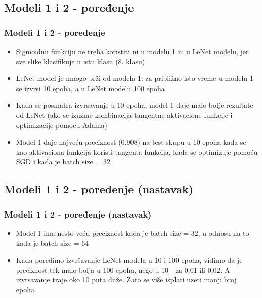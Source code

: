 \documentclass{beamer}
\begin{document}
\subsection{Modeli 1 i 2 - poređenje}
\begin{frame}
\frametitle{Modeli 1 i 2 - poređenje}

\begin{itemize}
\item Sigmoidnu funkciju ne treba koristiti ni u modelu 1 ni u LeNet modelu, jer sve slike klasifikuje u istu klasu (8. klasu)
\item LeNet model je mnogo brži od modela 1: za približno isto vreme u modelu 1 se izvrsi 10 epoha, a u LeNet modelu 100 epoha
\item Kada se posmatra izvrsavanje u 10 epoha, model 1 daje malo bolje rezultate od LeNet (ako se izuzme kombinacija tangentne aktivacione funkcije i optimizacije pomocu Adama)
\item Model 1 daje najveću preciznost (0.908) na test skupu u 10 epoha kada se kao aktivaciona funkcija koristi tangenta funkcija, kada se optimizuje pomoću SGD i kada je batch size = 32
\end{itemize}

\end{frame}


\subsection{Modeli 1 i 2 - poređenje (nastavak)}
\begin{frame}
\frametitle{Modeli 1 i 2 - poređenje (nastavak)}

\begin{itemize}
\item Model 1 ima nesto veću preciznost kada je batch size = 32, u odnosu na to kada je batch size = 64
\item Kada poredimo izvršavanje LeNet modela u 10 i 100 epoha, vidimo da je preciznost tek malo bolja u 100 epoha, nego u 10 - za 0.01 ili 0.02. A izvrsavanje traje oko 10 puta duže. Zato se više isplati uzeti manji broj epoha.
\end{itemize}

\end{frame}

\end{document}
